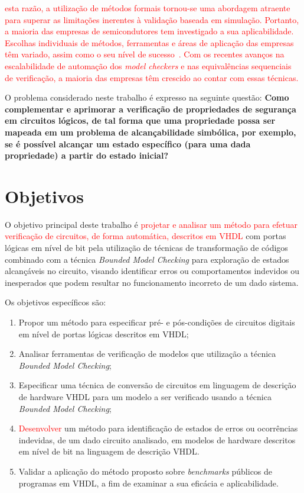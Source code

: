 
\textcolor{red}{ esta razão, a utilização de métodos formais tornou-se uma abordagem atraente para superar as limitações inerentes à validação baseada em simulação. Portanto, a maioria das empresas de semicondutores tem investigado a sua aplicabilidade. Escolhas individuais de métodos, ferramentas e áreas de aplicação das empresas têm variado, assim como o seu nível de sucesso~\cite{cabodi2016hardware}. Com os recentes avanços na escalabilidade de automação dos \textit{model checkers} e nas equivalências sequenciais de verificação, a maioria das empresas têm crescido ao contar com essas técnicas\cite{clarke2008birth}.}

O problema considerado neste trabalho é expresso na seguinte questão: \textbf{Como complementar e aprimorar a verificação de propriedades de segurança em circuitos lógicos, de tal forma que uma propriedade possa ser mapeada em um problema de alcançabilidade simbólica, por exemplo, se é possível alcançar um estado específico (para uma dada propriedade) a partir do estado inicial?}


\section{Objetivos}
O objetivo principal deste trabalho é \textcolor{red}{projetar e analisar um método para efetuar verificação de circuitos, de forma automática, descritos em VHDL} com portas lógicas em nível de bit pela utilização de técnicas de transformação de códigos combinado com a técnica \textit{Bounded Model Checking} para exploração de estados alcançáveis no circuito, visando identificar erros ou comportamentos indevidos ou inesperados que podem resultar no funcionamento incorreto de um dado sistema.

Os objetivos específicos são:
\begin{enumerate}
  \item Propor um método para especificar pré- e pós-condições de circuitos digitais em nível de portas lógicas descritos em VHDL;
  \item Analisar ferramentas de verificação de modelos que utilização a técnica \textit{Bounded Model Checking};
  \item Especificar uma técnica de conversão de circuitos em linguagem de descrição de hardware VHDL para um modelo a ser verificado usando a técnica \textit{Bounded Model Checking};
   \item \textcolor{red}{Desenvolver} um método para identificação de estados de erros ou ocorrências indevidas, de um dado circuito analisado, em modelos de hardware descritos em nível de bit na linguagem de descrição VHDL.
  \item Validar a aplicação do método proposto sobre \textit{benchmarks} públicos de programas em VHDL, a fim de examinar a sua eficácia e aplicabilidade.
\end{enumerate}

